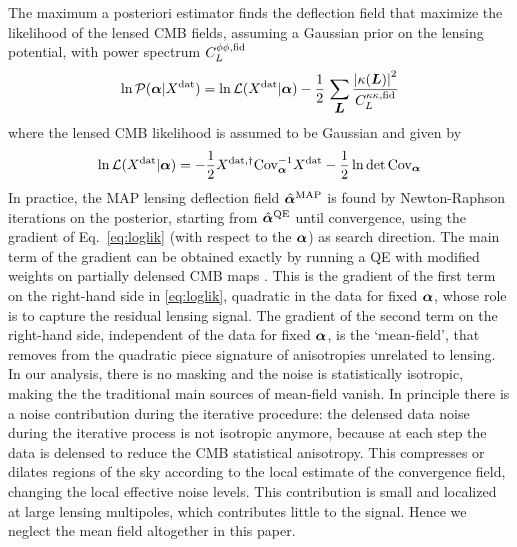 \documentclass[prd, superscriptaddress, tightenlines, longbibliography, nofootinbib, eqsecnum, amsfonts, amsmath, floatfix, twocolumn, notitlepage]{revtex4-2}
\newcommand{\Cov}[0]{ {\rm{Cov}} }
\begin{document}
The maximum a posteriori estimator finds the deflection field that maximize the likelihood of the lensed CMB fields, assuming a Gaussian prior on the lensing potential, with power spectrum $C_L^{\phi\phi, \rm fid}$
\begin{equation}
    \ln \mathcal{P}({\boldsymbol{\alpha}} | X^{\rm dat}) = \ln \mathcal{L}( X^{\rm dat} | {\boldsymbol{\alpha}}) - \frac{1}{2} \, \sum_{\mbox{\boldmath{$L$}}} \frac{\left|\kappa({\mbox{\boldmath{$L$}}})\right|^2}{C_L^{\kappa\kappa, \rm fid}}
\end{equation}
where the lensed CMB likelihood is assumed to be Gaussian and given by 
\begin{equation}\label{eq:loglik}
    \ln \mathcal{L}( X^{\rm dat} | \valpha) = -\frac{1}{2} X^{\rm dat, \dagger }\Cov_\valpha^{-1} X^{\rm dat} - \frac{1}{2}\ln \det \Cov_\valpha
\end{equation}
In practice, the MAP lensing deflection field $\hat {{\boldsymbol{\alpha}}}^{\rm MAP}$ is found by Newton-Raphson iterations on the posterior, starting from $\hat {{\boldsymbol{\alpha}}}^{\rm QE}$ until convergence, using the gradient of Eq.~\eqref{eq:loglik} (with respect to the ${\boldsymbol{\alpha}}$) as search direction. The main term of the gradient can be obtained exactly by running a QE with modified weights on partially delensed CMB maps  \cite[see][for more details]{Carron:2017mqf}. This is the gradient of the first term on the right-hand side in \eqref{eq:loglik}, quadratic in the data for fixed ${\boldsymbol{\alpha}}$, whose role is to capture the residual lensing signal. The gradient of the second term on the right-hand side, independent of the data for fixed ${\boldsymbol{\alpha}}$, is the `mean-field', that removes from the quadratic piece signature of anisotropies unrelated to lensing. In our analysis, there is no masking and the noise is statistically isotropic, making the the traditional main sources of mean-field vanish. In principle there is a noise contribution during the iterative procedure: the delensed data noise during the iterative process is not isotropic anymore, because at each step the data is delensed to reduce the CMB statistical anisotropy. This compresses or dilates regions of the sky according to the local estimate of the convergence field, changing the local effective noise levels. This contribution is small and localized at large lensing multipoles, which contributes little to the signal. Hence we neglect the mean field altogether in this paper. 
\end{document}
